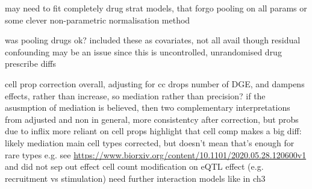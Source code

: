 \begin{outline}
        \3 may need to fit completely drug strat models, that forgo pooling on all params
        \3 or some clever non-parametric normalisation method

    \2 was pooling drugs ok?
        \3 included these as covariates, not all avail though
        \3 residual confounding may be an issue since this is uncontrolled, unrandomised
        \3 drug prescribe diffs

    \2 cell prop correction
        \3 overall, adjusting for cc drops number of DGE, and dampens effects, rather than increase, so mediation rather than precision?
        \3 if the asusmption of mediation is believed, then two complementary interpretations from adjusted and non
        \3 in general, more consistentcy after correction, but probs due to inflix more reliant on cell props
        \3 highlight that cell comp makes a big diff: likely mediation
         main cell types corrected, but doesn't mean that's enough for rare types e.g. see \url{https://www.biorxiv.org/content/10.1101/2020.05.28.120600v1} 
        \3 and did not sep out effect cell count modification on eQTL effect (e.g. recruitment vs stimulation)
        \3 need further interaction models like in ch3


\end{outline}
